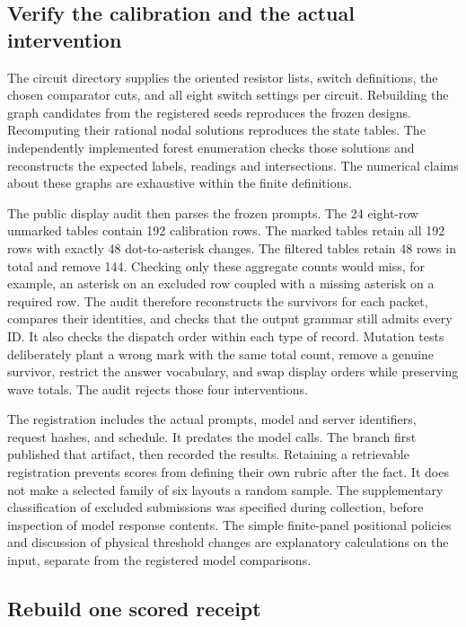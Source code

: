 \documentclass[12pt,letterpaper]{article}
\begin{document}
\subsection{Verify the calibration and the actual intervention}

The circuit directory supplies the oriented resistor lists, switch definitions, the chosen comparator cuts, and all eight switch settings per circuit. Rebuilding the graph candidates from the registered seeds reproduces the frozen designs. Recomputing their rational nodal solutions reproduces the state tables. The independently implemented forest enumeration checks those solutions and reconstructs the expected labels, readings and intersections. The numerical claims about these graphs are exhaustive within the finite definitions.

The public display audit then parses the frozen prompts. The 24 eight-row unmarked tables contain 192 calibration rows. The marked tables retain all 192 rows with exactly 48 dot-to-asterisk changes. The filtered tables retain 48 rows in total and remove 144. Checking only these aggregate counts would miss, for example, an asterisk on an excluded row coupled with a missing asterisk on a required row. The audit therefore reconstructs the survivors for each packet, compares their identities, and checks that the output grammar still admits every ID. It also checks the dispatch order within each type of record. Mutation tests deliberately plant a wrong mark with the same total count, remove a genuine survivor, restrict the answer vocabulary, and swap display orders while preserving wave totals. The audit rejects those four interventions.

The registration includes the actual prompts, model and server identifiers, request hashes, and schedule. It predates the model calls. The branch first published that artifact, then recorded the results. Retaining a retrievable registration prevents scores from defining their own rubric after the fact. It does not make a selected family of six layouts a random sample. The supplementary classification of excluded submissions was specified during collection, before inspection of model response contents. The simple finite-panel positional policies and discussion of physical threshold changes are explanatory calculations on the input, separate from the registered model comparisons.

\subsection{Rebuild one scored receipt}
\end{document}
